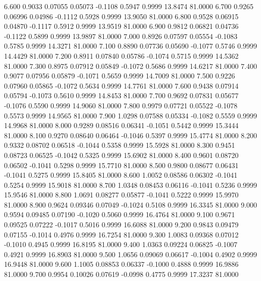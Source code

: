    6.600   0.9033   0.07055   0.05073  -0.1108   0.5947   0.9999  13.8474  81.0000
   6.700   0.9265   0.06996   0.04986  -0.1112   0.5928   0.9999  13.9050  81.0000
   6.800   0.9528   0.06915   0.04870  -0.1117   0.5912   0.9999  13.9519  81.0000
   6.900   0.9812   0.06821   0.04736  -0.1122   0.5899   0.9999  13.9897  81.0000
   7.000   0.8926   0.07597   0.05554  -0.1083   0.5785   0.9999  14.3271  81.0000
   7.100   0.8890   0.07736   0.05690  -0.1077   0.5746   0.9999  14.4429  81.0000
   7.200   0.8911   0.07840   0.05786  -0.1074   0.5715   0.9999  14.5362  81.0000
   7.300   0.8975   0.07912   0.05849  -0.1072   0.5686   0.9999  14.6217  81.0000
   7.400   0.9077   0.07956   0.05879  -0.1071   0.5659   0.9999  14.7009  81.0000
   7.500   0.9226   0.07960   0.05865  -0.1072   0.5634   0.9999  14.7761  81.0000
   7.600   0.9438   0.07914   0.05794  -0.1073   0.5610   0.9999  14.8453  81.0000
   7.700   0.9692   0.07831   0.05677  -0.1076   0.5590   0.9999  14.9060  81.0000
   7.800   0.9979   0.07721   0.05522  -0.1078   0.5573   0.9999  14.9565  81.0000
   7.900   1.0298   0.07588   0.05334  -0.1082   0.5559   0.9999  14.9968  81.0000
   8.000   0.9289   0.08516   0.06341  -0.1051   0.5442   0.9999  15.3444  81.0000
   8.100   0.9270   0.08640   0.06464  -0.1046   0.5397   0.9999  15.4774  81.0000
   8.200   0.9332   0.08702   0.06518  -0.1044   0.5358   0.9999  15.5928  81.0000
   8.300   0.9451   0.08723   0.06525  -0.1042   0.5325   0.9999  15.6902  81.0000
   8.400   0.9601   0.08720   0.06502  -0.1041   0.5298   0.9999  15.7710  81.0000
   8.500   0.9800   0.08677   0.06431  -0.1041   0.5275   0.9999  15.8405  81.0000
   8.600   1.0052   0.08586   0.06302  -0.1041   0.5254   0.9999  15.9018  81.0000
   8.700   1.0348   0.08453   0.06116  -0.1041   0.5236   0.9999  15.9546  81.0000
   8.800   1.0691   0.08277   0.05877  -0.1041   0.5222   0.9999  15.9970  81.0000
   8.900   0.9624   0.09346   0.07049  -0.1024   0.5108   0.9999  16.3345  81.0000
   9.000   0.9594   0.09485   0.07190  -0.1020   0.5060   0.9999  16.4764  81.0000
   9.100   0.9671   0.09525   0.07222  -0.1017   0.5016   0.9999  16.6088  81.0000
   9.200   0.9843   0.09479   0.07155  -0.1014   0.4976   0.9999  16.7254  81.0000
   9.300   1.0083   0.09368   0.07012  -0.1010   0.4945   0.9999  16.8195  81.0000
   9.400   1.0363   0.09224   0.06825  -0.1007   0.4921   0.9999  16.8903  81.0000
   9.500   1.0656   0.09069   0.06617  -0.1004   0.4902   0.9999  16.9448  81.0000
   9.600   1.1005   0.08853   0.06337  -0.1000   0.4888   0.9999  16.9886  81.0000
   9.700   0.9954   0.10026   0.07619  -0.0998   0.4775   0.9999  17.3237  81.0000
